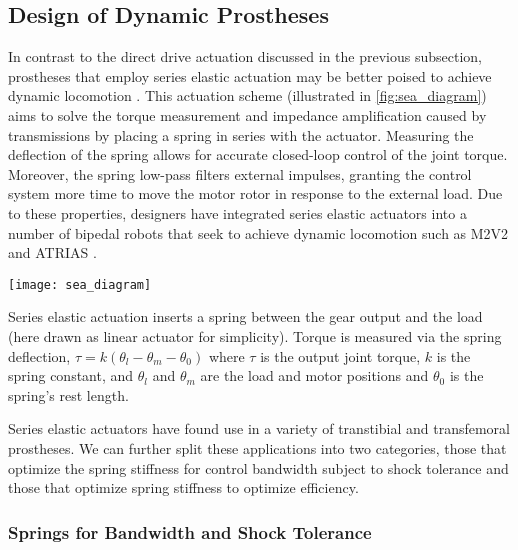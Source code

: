 

\subsection{Design of Dynamic Prostheses}

In contrast to the direct drive actuation discussed in the previous subsection,
prostheses that employ series elastic actuation may be better poised to achieve
dynamic locomotion \citep{pratt1995series}. This actuation scheme (illustrated
in \cref{fig:sea_diagram}) aims to solve the torque measurement and impedance
amplification caused by transmissions by placing a spring in series with the
actuator. Measuring the deflection of the spring allows for accurate closed-loop
control of the joint torque. Moreover, the spring low-pass filters external
impulses, granting the control system more time to move the motor rotor in
response to the external load.  Due to these properties, designers have
integrated series elastic actuators into a number of bipedal robots that seek to
achieve dynamic locomotion such as M2V2 \citep{pratt2008design} and ATRIAS
\citep{grimes2013atrias}.

\begin{marginfigure}
    \centering
    \texttt{[image: sea\_diagram]}
    \caption{Series elastic actuation inserts a spring between the gear output
    and the load (here drawn as linear actuator for simplicity). Torque is
    measured via the spring deflection, $\tau = k(\theta_l - \theta_m -
    \theta_0)$ where $\tau$ is the output joint torque, $k$ is the spring
    constant, and $\theta_l$ and $\theta_m$ are the load and motor positions and
    $\theta_0$ is the spring's rest length.}
    \label{fig:sea_diagram}
\end{marginfigure}

Series elastic actuators have found use in a variety of transtibial and
transfemoral prostheses. We can further split these applications into two
categories, those that optimize the spring stiffness for control bandwidth
subject to shock tolerance and those that optimize spring stiffness to optimize
efficiency.

\subsubsection{Springs for Bandwidth and Shock Tolerance}

